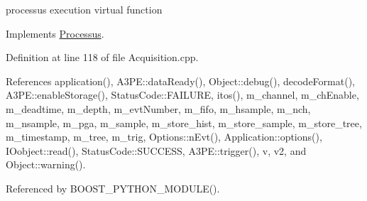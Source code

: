 processus execution virtual function 

Implements \hyperlink{classProcessus_a63767a63a1fb0055c5aa45b21a4a5d58}{Processus}.



Definition at line 118 of file Acquisition.\+cpp.



References application(), A3\+P\+E\+::data\+Ready(), Object\+::debug(), decode\+Format(), A3\+P\+E\+::enable\+Storage(), Status\+Code\+::\+F\+A\+I\+L\+U\+RE, itos(), m\+\_\+channel, m\+\_\+ch\+Enable, m\+\_\+deadtime, m\+\_\+depth, m\+\_\+evt\+Number, m\+\_\+fifo, m\+\_\+hsample, m\+\_\+nch, m\+\_\+nsample, m\+\_\+pga, m\+\_\+sample, m\+\_\+store\+\_\+hist, m\+\_\+store\+\_\+sample, m\+\_\+store\+\_\+tree, m\+\_\+timestamp, m\+\_\+tree, m\+\_\+trig, Options\+::n\+Evt(), Application\+::options(), I\+Oobject\+::read(), Status\+Code\+::\+S\+U\+C\+C\+E\+SS, A3\+P\+E\+::trigger(), v, v2, and Object\+::warning().



Referenced by B\+O\+O\+S\+T\+\_\+\+P\+Y\+T\+H\+O\+N\+\_\+\+M\+O\+D\+U\+L\+E().


